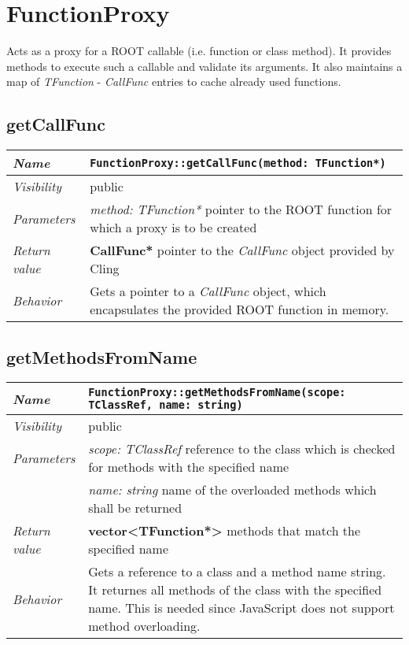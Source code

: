 \chapter{FunctionProxy}
	Acts as a proxy for a ROOT callable (i.e. function or class method). It provides methods to execute such a callable and validate its arguments. It also maintains a map of \textit{TFunction} - \textit{CallFunc} entries to cache already used functions.

\section{getCallFunc}
\begin{longtable}{p{3cm} @{\hskip 1cm} p{12cm}}
	\hline

	\textit{Name} & \texttt{FunctionProxy::getCallFunc(method: TFunction*)}\\
	\hline

	\textit{Visibility} & public\\
	\hline

	\textit{Parameters} & \textit{method: TFunction*} pointer to the ROOT function for which a proxy is to be created\\
	\hline

	\textit{Return value} & \textbf{CallFunc*} pointer to the \textit{CallFunc} object provided by Cling\\
	\hline

	\textit{Behavior} & Gets a pointer to a \textit{CallFunc} object, which encapsulates the provided ROOT function in memory.\\
	\hline

\end{longtable}
\pagebreak

\section{getMethodsFromName}
\begin{longtable}{p{3cm} @{\hskip 1cm} p{12cm}}
	\hline

	\textit{Name} & \texttt{FunctionProxy::getMethodsFromName(scope: TClassRef, name: string)}\\
	\hline

	\textit{Visibility} & public\\
	\hline

	\textit{Parameters} & \textit{scope: TClassRef} reference to the class which is checked for methods with the specified name\\
		& \textit{name: string} name of the overloaded methods which shall be returned\\
	\hline

	\textit{Return value} & \textbf{vector<TFunction*>} methods that match the specified name\\
	\hline

	\textit{Behavior} & Gets a reference to a class and a method name string. It returnes all methods of the class with the specified name. This is needed since JavaScript does not support method overloading.\\
	\hline

\end{longtable}
\pagebreak

